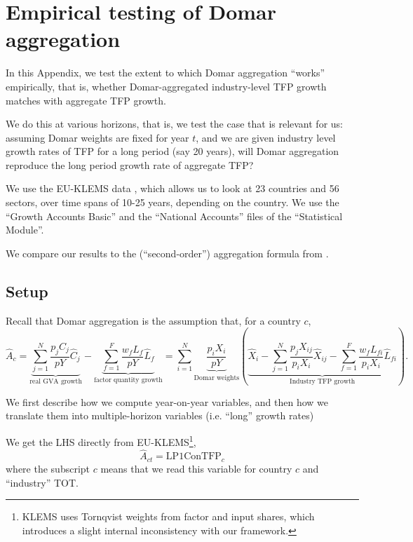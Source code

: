 \section{Empirical testing of Domar aggregation}
\label{appendix:validation_Domar}

In this Appendix, we test the extent to which Domar aggregation ``works'' empirically, that is, whether Domar-aggregated industry-level TFP growth matches with aggregate TFP growth. 

We do this at various horizons, that is, we test the case that is relevant for us: assuming Domar weights are fixed for year $t$, and we are given industry level growth rates of TFP for a long period (say 20 years), will Domar aggregation reproduce the long period growth rate of aggregate TFP?

We use the EU-KLEMS data \citep{bontadiniEUKLEMSINTANProdIndustry2023}, which allows us to look at 23 countries and 56 sectors, over time spans of 10-25 years, depending on the country. We use the ``Growth Accounts Basic'' and the ``National Accounts'' files of the ``Statistical Module''. 



We compare our results to the (``second-order'') aggregation formula from \citet{baqaeeMacroeconomicImpactMicroeconomic2019}.

\subsection{Setup}

Recall that Domar aggregation is the assumption that, for a country $c$,
\begin{equation}
    \hat{A}_{c} = \underbrace{\sum_{j=1}^N \frac{p_jC_j}{pY}\hat{C}_j}_{\text{real GVA growth}}-
    \underbrace{\sum_{f=1}^F \frac{w_fL_f}{pY}\hat{L}_f }_{\text{factor quantity growth}}= 
 \sum_{i=1}^N \underbrace{\frac{p_iX_i}{pY}}_{\text{Domar weights}} \left( \underbrace{    \hat{X}_i-
    \sum_{j=1}^N\frac{p_jX_{ij}}{p_iX_i}\hat{X}_{ij}-
    \sum_{f=1}^F \frac{w_fL_{fi}}{p_iX_i}\hat{L}_{fi}
}_{\text{Industry TFP growth}}
    \right).
\end{equation}

We first describe how we compute year-on-year variables, and then how we translate them into multiple-horizon variables (i.e. ``long'' growth rates)


We get the LHS directly from EU-KLEMS\footnote{
%
KLEMS uses Tornqvist weights from factor and input shares, which introduces a slight internal inconsistency with our framework.
%
},
\[
\hat{A}_{ct} = \text{LP1ConTFP}_c
\]
where the subscript $c$ means that we read this variable for country $c$ and ``industry'' TOT. 

